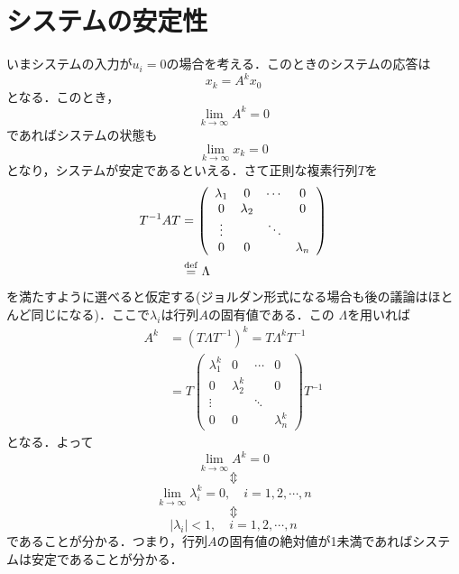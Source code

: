 \section{システムの安定性}
いまシステムの入力が$u_i = 0$の場合を考える．このときのシステムの応答は
\begin{equation}
 x_k = A^k x_0
\end{equation}
となる．このとき，
\begin{equation}
 \lim_{k \rightarrow \infty} A^k = 0
\end{equation}
であればシステムの状態も
\begin{equation}
 \lim_{k \rightarrow \infty} x_k = 0
\end{equation}
となり，システムが安定であるといえる．さて正則な複素行列$T$を
\begin{align}
 T^{-1} A T
  &=
  \left(\begin{array}{cccc}
         \lambda_1 & 0         & \cdots & 0 \\
	 0         & \lambda_2 &        & 0 \\
	 \vdots    &           & \ddots & \\
	 0         & 0         &        & \lambda_n 
	\end{array}\right) \nonumber \\
 &\stackrel{\rm def}{=} \Lambda
\end{align}
を満たすように選べると仮定する(ジョルダン形式になる場合も後の議論はほと
んど同じになる)．ここで$\lambda_i$は行列$A$の固有値である．この
$\Lambda$を用いれば
\begin{align}
 A^k &= (T \Lambda T^{-1})^k = T \Lambda ^k T^{-1} \nonumber \\
 &= T
  \left(\begin{array}{cccc}
         \lambda_1^k & 0           & \cdots & 0 \\
	 0           & \lambda_2^k &        & 0 \\
	 \vdots      &             & \ddots & \\
	 0           & 0           &        & \lambda_n^k
	\end{array}\right)
  T^{-1}
\end{align}
となる．よって
\begin{equation}
 \lim_{k \rightarrow \infty} A^k = 0
\end{equation}
\[\Updownarrow\]
\begin{equation}
 \lim_{k \rightarrow \infty} \lambda_i^k = 0, \quad
  i = 1, 2, \cdots, n
\end{equation}
\[\Updownarrow\]
\begin{equation}
 \vert \lambda_i \vert < 1, \quad i = 1, 2, \cdots, n
\end{equation}
であることが分かる．つまり，行列$A$の固有値の絶対値が1未満であればシステ
ムは安定であることが分かる．
